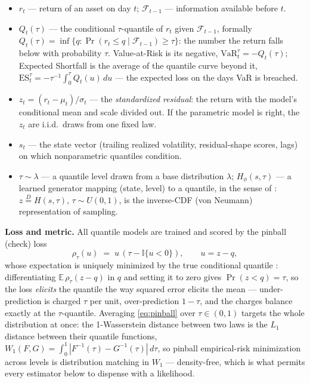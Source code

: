 \documentclass[11pt]{article}
\newcommand{\VaR}{\mathrm{VaR}}
\newcommand{\ES}{\mathrm{ES}}
\theoremstyle{remark}
\begin{document}
\begin{itemize}[leftmargin=1.5em,itemsep=0pt]
\item $r_t$ --- return of an asset on day $t$; $\mathcal{F}_{t-1}$ ---
information available before $t$.
\item $Q_t(\tau)$ --- the conditional $\tau$-quantile of $r_t$ given
$\mathcal{F}_{t-1}$, formally
$Q_t(\tau) = \inf\{q : \Pr(r_t \le q \mid \mathcal{F}_{t-1}) \ge \tau\}$:
the number the return falls below with probability $\tau$. Value-at-Risk
is its negative, $\VaR_t^{\tau} = -Q_t(\tau)$;
Expected Shortfall is the average of the quantile curve beyond it,
$\ES_t^{\tau} = -\tau^{-1}\int_0^{\tau} Q_t(u)\,du$ --- the expected
loss on the days VaR is breached.
\item $z_t = (r_t-\mu_t)/\sigma_t$ --- the \emph{standardized residual}:
the return with the model's conditional mean and scale divided out. If
the parametric model is right, the $z_t$ are i.i.d.\ draws from one
fixed law.
\item $s_t$ --- the state vector (trailing realized volatility,
residual-shape scores, lags) on which nonparametric quantiles condition.
\item $\tau \sim \lambda$ --- a quantile level drawn from a base
distribution $\lambda$; $H_\phi(s,\tau)$ --- a learned generator mapping
(state, level) to a quantile, in the sense of
\citet{polson2023gbc}: $z \overset{D}{=} H(s,\tau)$, $\tau\sim U(0,1)$,
is the inverse-CDF (von Neumann) representation of sampling.
\end{itemize}

\noindent\textbf{Loss and metric.} All quantile models are trained and
scored by the pinball (check) loss
\begin{equation}
\rho_\tau(u) \;=\; u\,(\tau - \mathbb{I}\{u<0\}),
\qquad u = z - q,
\label{eq:pinball}
\end{equation}
whose expectation is uniquely minimized by the true conditional quantile
\citep{koenker1978}: differentiating
$\mathbb{E}\,\rho_\tau(z - q)$ in $q$ and setting it to zero gives
$\Pr(z < q) = \tau$, so the loss \emph{elicits} the quantile the way
squared error elicits the mean --- under-prediction is charged $\tau$
per unit, over-prediction $1-\tau$, and the charges balance exactly at
the $\tau$-quantile. Averaging \eqref{eq:pinball} over $\tau\in(0,1)$
targets the whole distribution at once: the 1-Wasserstein distance
between two laws is the $L_1$ distance between their quantile functions,
$W_1(F,G)=\int_0^1 |F^{-1}(\tau)-G^{-1}(\tau)|\,d\tau$, so pinball
empirical-risk minimization across levels is distribution matching in
$W_1$ --- density-free, which is what permits every estimator below to
dispense with a likelihood.
\end{document}
